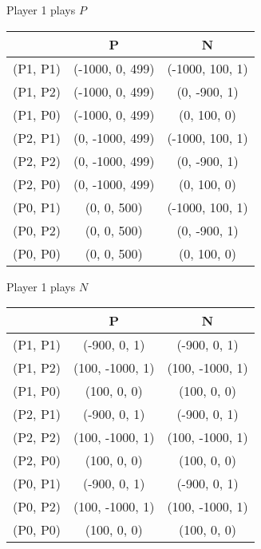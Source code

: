 \documentclass[]{article}
\begin{document}
\begin{table}[h]
	\centering
	\begin{minipage}{0.5\linewidth}
		\centering
		Player 1 plays $P$\\
		\begin{tabular}{c|cc}
			\backslashbox{3}{2} & P & N \\ \hline
			(P1, P1) & (-1000, 0, 499) & (-1000, 100, 1) \\
			(P1, P2) & (-1000, 0, 499) & (0, -900, 1) \\
			(P1, P0) & (-1000, 0, 499) & (0, 100, 0) \\
			(P2, P1) & (0, -1000, 499) & (-1000, 100, 1) \\
			(P2, P2) & (0, -1000, 499) & (0, -900, 1) \\
			(P2, P0) & (0, -1000, 499) & (0, 100, 0) \\
			(P0, P1) & (0, 0, 500) & (-1000, 100, 1) \\
			(P0, P2) & (0, 0, 500) & (0, -900, 1) \\
			(P0, P0) & (0, 0, 500) & (0, 100, 0)
		\end{tabular}
	\end{minipage}%
	\begin{minipage}{0.5\linewidth}
		\centering
		Player 1 plays $N$\\
		\begin{tabular}{c|cc}
			\backslashbox{3}{2} & P & N \\ \hline
			(P1, P1) & (-900, 0, 1) & (-900, 0, 1) \\
			(P1, P2) & (100, -1000, 1) & (100, -1000, 1) \\
			(P1, P0) & (100, 0, 0) & (100, 0, 0) \\
			(P2, P1) & (-900, 0, 1) & (-900, 0, 1) \\
			(P2, P2) & (100, -1000, 1) & (100, -1000, 1) \\
			(P2, P0) & (100, 0, 0) & (100, 0, 0) \\
			(P0, P1) & (-900, 0, 1) & (-900, 0, 1) \\
			(P0, P2) & (100, -1000, 1) & (100, -1000, 1) \\
			(P0, P0) & (100, 0, 0) & (100, 0, 0)
		\end{tabular}
	\end{minipage}
\end{table}
\end{document}
